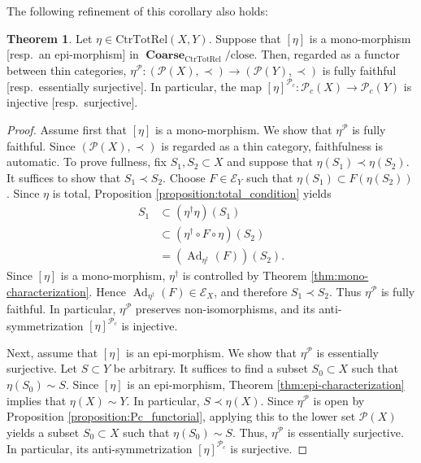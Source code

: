 \documentclass[12pt, a4paper]{amsart}
\theoremstyle{definition}
\newtheorem{theorem}{Theorem}[section]
\newcommand{\Ad}{\mathop{\mathrm{Ad}}\nolimits}
\newcommand{\Coarse}{\mathop{\mathbf{Coarse}}\nolimits}
\newcommand{\CtrTotRel}{\mathrm{CtrTotRel}}
\newcommand{\close}{\mathrm{close}}
\begin{document}
The following refinement of this corollary also holds:

\begin{theorem}\label{theorem:etaPcspimono}
Let $\eta\in\CtrTotRel(X,Y)$. Suppose that $[\eta]$ is a mono-morphism [resp.~an epi-morphism] in $\Coarse_{\CtrTotRel}/{\close}$. Then, regarded as a functor between thin categories, $\eta^{\mathcal{P}} : (\mathcal{P}(X),\prec) \rightarrow (\mathcal{P}(Y),\prec)$ is fully faithful [resp.~essentially surjective]. In particular, the map $[\eta]^{\mathcal{P}_c} : \mathcal{P}_c(X) \rightarrow \mathcal{P}_c(Y)$ is injective [resp.~surjective].
\end{theorem}

\begin{proof}
Assume first that $[\eta]$ is a mono-morphism. We show that $\eta^\mathcal{P}$ is fully faithful. Since $(\mathcal{P}(X),\prec)$ is regarded as a thin category, faithfulness is automatic. To prove fullness, fix $S_1,S_2 \subset X$ and suppose that $\eta(S_1) \prec \eta(S_2)$. It suffices to show that $S_1 \prec S_2$. Choose $F \in \mathcal{E}_Y$ such that $\eta(S_1) \subset F(\eta(S_2))$. Since $\eta$ is total, Proposition \ref{proposition:total_condition} yields
\begin{align*}
S_1 
    &\subset (\eta^\dagger \eta)(S_1) \\
    &\subset (\eta^\dagger \circ F \circ \eta)(S_2) \\
    &= (\Ad_{\eta^\dagger}(F))(S_2).
\end{align*}
Since $[\eta]$ is a mono-morphism, $\eta^\dagger$ is controlled by Theorem \ref{thm:mono-characterization}. Hence $\Ad_{\eta^\dagger}(F) \in \mathcal{E}_X$, and therefore $S_1 \prec S_2$. Thus $\eta^{\mathcal{P}}$ is fully faithful. In particular, $\eta^{\mathcal{P}}$ preserves non-isomorphisms, and its anti-symmetrization $[\eta]^{\mathcal{P}_c}$ is injective.

Next, assume that $[\eta]$ is an epi-morphism. We show that $\eta^{\mathcal{P}}$ is essentially surjective. Let $S \subset Y$ be arbitrary. It suffices to find a subset $S_0 \subset X$ such that $\eta(S_0) \sim S$. Since $[\eta]$ is an epi-morphism, Theorem \ref{thm:epi-characterization} implies that $\eta(X) \sim Y$. In particular, $S \prec \eta(X)$. Since $\eta^{\mathcal{P}}$ is open by Proposition \ref{proposition:Pc_functorial}, applying this to the lower set $\mathcal{P}(X)$ yields a subset $S_0 \subset X$ such that $\eta(S_0) \sim S$. Thus, $\eta^{\mathcal{P}}$ is essentially surjective. In particular, its anti-symmetrization $[\eta]^{\mathcal{P}_c}$ is surjective.\end{proof}
\end{document}
